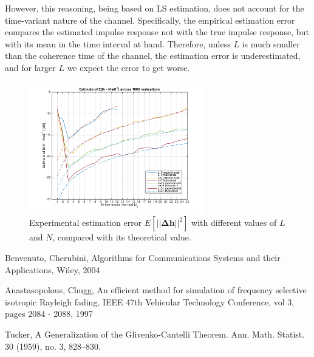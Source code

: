 \documentclass[10pt]{article}
\begin{document}
However, this reasoning, being based on LS estimation, does not account for the time-variant nature of the channel. Specifically, the empirical estimation error compares the estimated impulse response not with the true impulse response, but with its mean in the time interval at hand. Therefore, unless $L$ is much smaller than the coherence time of the channel, the estimation error is underestimated, and for larger $L$ we expect the error to get worse.

\begin{figure}[ht]
	\centering
	\includegraphics[width=0.68\textwidth]{p02_comparetheoreticaldeltah}
	\caption{Experimental estimation error $E[||\mathbf{\Delta h}||^2]$ with different values of $L$ and $N$, compared with its theoretical value.}
    \label{fig:p02_comparetheoreticaldeltah}
\end{figure}


\begin{thebibliography}{10}

Benvenuto, Cherubini, Algorithms for Communications Systems and their Applications, Wiley, 2004

Anastasopolous, Chugg, An efficient method for simulation of frequency selective isotropic Rayleigh fading, IEEE 47th Vehicular Technology Conference, vol 3, pages 2084 - 2088, 1997

Tucker, A Generalization of the Glivenko-Cantelli Theorem. Ann. Math. Statist. 30 (1959), no. 3, 828--830.

\end{thebibliography}
\end{document}

